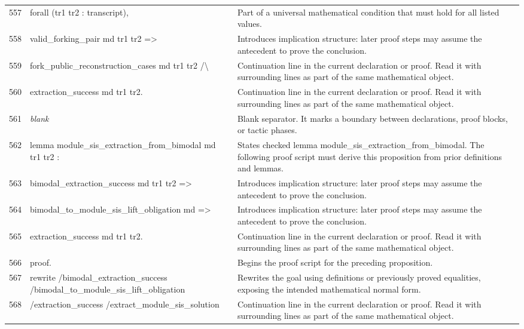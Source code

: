 \documentclass[10pt]{article}
\begin{document}
\begin{longtable}{r L{0.53\textwidth} L{0.37\textwidth}}
557 & {\ttfamily\scriptsize   forall (tr1 tr2 : transcript),} & Part of a universal mathematical condition that must hold for all listed values. \\
558 & {\ttfamily\scriptsize     valid\_forking\_pair md tr1 tr2 =>} & Introduces implication structure: later proof steps may assume the antecedent to prove the conclusion. \\
559 & {\ttfamily\scriptsize     fork\_public\_reconstruction\_cases md tr1 tr2 /\textbackslash{}} & Continuation line in the current declaration or proof.  Read it with surrounding lines as part of the same mathematical object. \\
560 & {\ttfamily\scriptsize     extraction\_success md tr1 tr2.} & Continuation line in the current declaration or proof.  Read it with surrounding lines as part of the same mathematical object. \\
561 & {\ttfamily\scriptsize \emph{blank}} & Blank separator.  It marks a boundary between declarations, proof blocks, or tactic phases. \\
562 & {\ttfamily\scriptsize lemma module\_sis\_extraction\_from\_bimodal md tr1 tr2 :} & States checked lemma module\_sis\_extraction\_from\_bimodal.  The following proof script must derive this proposition from prior definitions and lemmas. \\
563 & {\ttfamily\scriptsize   bimodal\_extraction\_success md tr1 tr2 =>} & Introduces implication structure: later proof steps may assume the antecedent to prove the conclusion. \\
564 & {\ttfamily\scriptsize   bimodal\_to\_module\_sis\_lift\_obligation md =>} & Introduces implication structure: later proof steps may assume the antecedent to prove the conclusion. \\
565 & {\ttfamily\scriptsize   extraction\_success md tr1 tr2.} & Continuation line in the current declaration or proof.  Read it with surrounding lines as part of the same mathematical object. \\
566 & {\ttfamily\scriptsize proof.} & Begins the proof script for the preceding proposition. \\
567 & {\ttfamily\scriptsize rewrite /bimodal\_extraction\_success /bimodal\_to\_module\_sis\_lift\_obligation} & Rewrites the goal using definitions or previously proved equalities, exposing the intended mathematical normal form. \\
568 & {\ttfamily\scriptsize         /extraction\_success /extract\_module\_sis\_solution} & Continuation line in the current declaration or proof.  Read it with surrounding lines as part of the same mathematical object. \\

\end{longtable}
\end{document}
